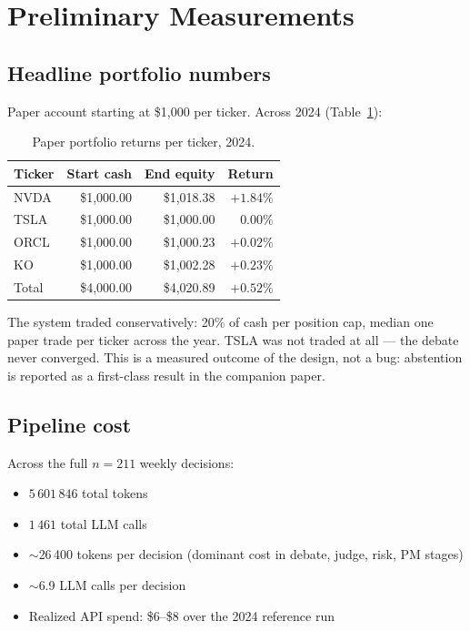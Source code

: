 \documentclass[conference]{IEEEtran}
\begin{document}
\section{Preliminary Measurements}

\subsection{Headline portfolio numbers}
Paper account starting at \$1{,}000 per ticker. Across 2024
(Table~\ref{tab:portfolio}):

\begin{table}[t]
\caption{Paper portfolio returns per ticker, 2024.}
\label{tab:portfolio}
\centering\footnotesize
\begin{tabular}{lrrr}
\toprule
Ticker & Start cash & End equity & Return \\
\midrule
NVDA  & \$1{,}000.00 & \$1{,}018.38 & $+1.84\%$ \\
TSLA  & \$1{,}000.00 & \$1{,}000.00 & $0.00\%$ \\
ORCL  & \$1{,}000.00 & \$1{,}000.23 & $+0.02\%$ \\
KO    & \$1{,}000.00 & \$1{,}002.28 & $+0.23\%$ \\
\midrule
Total & \$4{,}000.00 & \$4{,}020.89 & $+0.52\%$ \\
\bottomrule
\end{tabular}
\end{table}

The system traded conservatively: 20\% of cash per position cap,
median one paper trade per ticker across the year. TSLA was not
traded at all --- the debate never converged. This is a measured
outcome of the design, not a bug: abstention is reported as a
first-class result in the companion paper.

\subsection{Pipeline cost}
Across the full $n{=}211$ weekly decisions:
\begin{itemize}
  \item $5\,601\,846$ total tokens
  \item $1\,461$ total LLM calls
  \item $\sim$26\,400 tokens per decision (dominant cost in debate,
  judge, risk, PM stages)
  \item $\sim$6.9 LLM calls per decision
  \item Realized API spend: \$6--\$8 over the 2024 reference run
\end{itemize}
\end{document}
